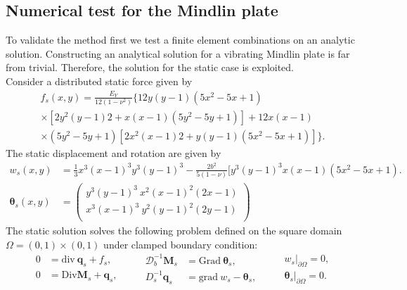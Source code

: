 \subsection{Numerical test for the Mindlin plate}\label{sec:numtest_min}
To validate the method first we test a finite element combinations on an analytic solution. Constructing an analytical solution for a vibrating Mindlin plate is far from trivial. Therefore, the solution for the static case \cite{veiga2013} is exploited. \\

Consider a distributed static force given by 
\begin{equation*}
\begin{aligned}
f_s(x,y)=\frac{E_Y}{12 (1-\nu^2)} \{12 y(y-1)(5x^2-5x+1) \\
\times [2y^2(y-1)2+x(x-1)(5y^2-5y+1)] +12x(x-1)\\
\times (5y^2-5y+1)[2x^2(x-1)2+y(y-1)(5x^2-5x+1)]\}.
\end{aligned}
\end{equation*}
The static displacement and rotation are given by
\begin{align*}
w_s(x,y) &= \frac{1}{3} x^3(x-1)^3 y^3 (y-1)^3 -\frac{2 b^2}{5(1-\nu)}[y^3(y-1)^3 x(x-1)(5 x^2-5x+1). \\
\bm{\theta}_{s}(x,y) &= 
\begin{pmatrix}
y^3(y-1)^3 \ x^2 (x-1)^2 (2x-1) \\
x^3(x-1)^3 \ y^2 (y-1)^2 (2y-1) \\
\end{pmatrix}
\end{align*}
The static solution solves the following problem defined on the square domain $\Omega=(0,1)\times(0,1)$ under clamped boundary condition:
\begin{equation}
\begin{aligned}
0 &= \mathrm{div} \ \bm{q}_s + f_s , \\
0 &= \mathrm{Div} \bm{M}_s + \bm{q}_s, \\
\end{aligned} \qquad
\begin{aligned}
\bm{\mathcal{D}}_b^{-1} \bm{M}_s &= \mathrm{Grad} \ \bm{\theta}_s, \\
D_s^{-1} \bm{q}_s &= \mathrm{grad} \ w_s - \bm{\theta}_s, \\
\end{aligned}
\qquad
\begin{aligned}
w_s\vert_{\partial\Omega} = 0, \\
\bm{\theta}_s\vert_{\partial\Omega} = 0. \\
\end{aligned}
\end{equation}
